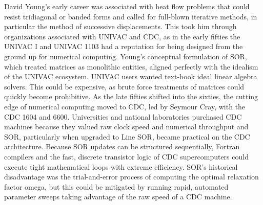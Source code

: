 David Young’s early career was associated with heat flow problems that could resist tridiagonal or banded forms and called for full-blown iterative methods, in particular the method of successive displacements. This took him through organizations associated with UNIVAC and CDC, as in the early fifties the UNIVAC I and UNIVAC 1103 had a reputation for being designed from the ground up for numerical computing. Young’s conceptual formulation of SOR, which treated matrices as monolithic entities, aligned perfectly with the idealism of the UNIVAC ecosystem. UNIVAC users wanted text-book ideal linear algebra solvers. This could be expensive, as brute force treatments of matrices could quickly become prohibitive. As the late fifties shifted into the sixties, the cutting edge of numerical computing moved to CDC, led by Seymour Cray, with the CDC 1604 and 6600. Universities and national laboratories purchased CDC machines because they valued raw clock speed and numerical throughput and SOR, particularly when upgraded to Line SOR, became practical on the CDC architecture. Because SOR updates can be structured sequentially, Fortran compilers and the fast, discrete transistor logic of CDC supercomputers could execute tight mathematical loops with extreme efficiency. SOR’s historical disadvantage was the trial-and-error process of computing the optimal relaxation factor omega, but this could be mitigated by running rapid, automated parameter sweeps taking advantage of the raw speed of a CDC machine.

